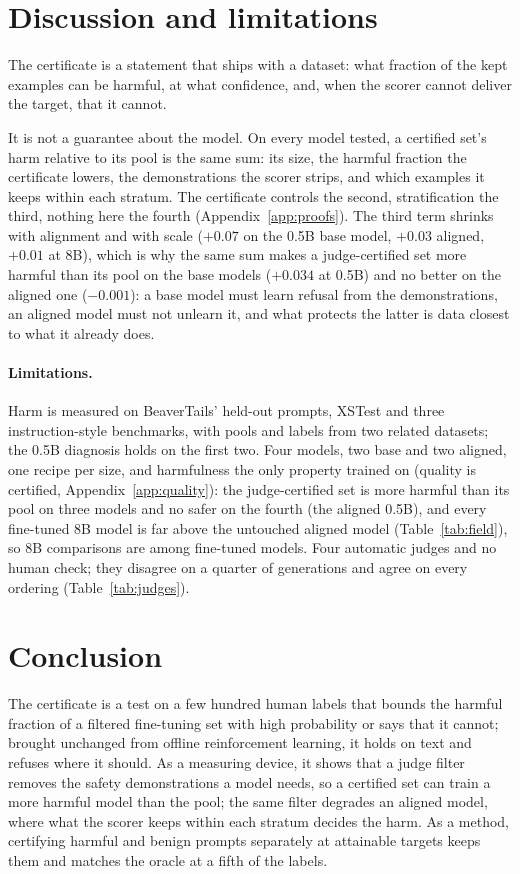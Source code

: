 \documentclass{article} %
\begin{document}
\section{Discussion and limitations}
\label{sec:discussion}
The certificate is a statement that ships with a dataset: what fraction of the kept examples can be harmful, at what confidence, and, when the scorer cannot deliver the target, that it cannot.

It is not a guarantee about the model. On every model tested, a certified set's harm relative to its pool is the same sum: its size, the harmful fraction the certificate lowers, the demonstrations the scorer strips, and which examples it keeps within each stratum. The certificate controls the second, stratification the third, nothing here the fourth (Appendix~\ref{app:proofs}). The third term shrinks with alignment and with scale ($+0.07$ on the 0.5B base model, $+0.03$ aligned, $+0.01$ at 8B), which is why the same sum makes a judge-certified set more harmful than its pool on the base models ($+0.034$ at 0.5B) and no better on the aligned one ($-0.001$): a base model must learn refusal from the demonstrations, an aligned model must not unlearn it, and what protects the latter is data closest to what it already does.

\paragraph{Limitations.} Harm is measured on BeaverTails' held-out prompts, XSTest and three instruction-style benchmarks, with pools and labels from two related datasets; the 0.5B diagnosis holds on the first two. Four models, two base and two aligned, one recipe per size, and harmfulness the only property trained on (quality is certified, Appendix~\ref{app:quality}): the judge-certified set is more harmful than its pool on three models and no safer on the fourth (the aligned 0.5B), and every fine-tuned 8B model is far above the untouched aligned model (Table~\ref{tab:field}), so 8B comparisons are among fine-tuned models. Four automatic judges and no human check; they disagree on a quarter of generations and agree on every ordering (Table~\ref{tab:judges}).

\section{Conclusion}
\label{sec:conclusion}
The certificate is a test on a few hundred human labels that bounds the harmful fraction of a filtered fine-tuning set with high probability or says that it cannot; brought unchanged from offline reinforcement learning, it holds on text and refuses where it should. As a measuring device, it shows that a judge filter removes the safety demonstrations a model needs, so a certified set can train a more harmful model than the pool; the same filter degrades an aligned model, where what the scorer keeps within each stratum decides the harm. As a method, certifying harmful and benign prompts separately at attainable targets keeps them and matches the oracle at a fifth of the labels.
\end{document}
